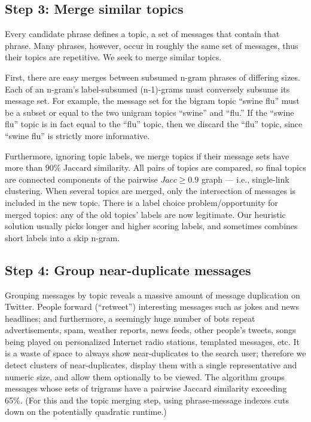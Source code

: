 \documentclass[letterpaper]{article}
\newcommand{\codenote}[1]{}
\begin{document}
\subsection{Step 3: Merge similar topics}
\codenote{ deduper.py }
Every candidate phrase defines a topic, a set of messages that contain that phrase.  Many phrases, however, occur in roughly the same set of messages, thus their topics are repetitive.  We seek to merge similar topics.

First, there are easy merges between subsumed n-gram phrases of differing sizes.  Each of an n-gram's label-subsumed (n-1)-grams must conversely subsume its message set.  For example, the message set for the bigram topic ``swine flu'' must be a subset or equal to the two unigram topics ``swine'' and ``flu.''  If the ``swine flu'' topic is in fact equal to the ``flu'' topic, then we discard the ``flu'' topic, since ``swine flu'' is strictly more informative.

Furthermore, ignoring topic labels, we merge topics if their message sets have more than $90\%$ Jaccard similarity.  All pairs of topics are compared, so final topics are connected components of the pairwise $Jacc \geq 0.9$ graph --- i.e., single-link clustering.  When several topics are merged, only the intersection of messages is included in the new topic.  There is a label choice problem/opportunity for merged topics: any of the old topics' labels are now legitimate.  Our heuristic solution usually picks longer and higher scoring labels, and sometimes combines short labels into a skip n-gram.

\subsection{Step 4: Group near-duplicate messages}

\codenote{ deduper.py }
Grouping messages by topic reveals a massive amount of message duplication on Twitter.  People forward (``retweet'') interesting messages such as jokes and news headlines; 
and furthermore, a seemingly huge number of bots repeat advertisements, spam, weather reports, news feeds, other people's tweets, songs being played on personalized Internet radio stations, templated messages, etc.
It is a waste of space to always show near-duplicates to the search user; therefore we detect clusters of near-duplicates, display them with a single representative and numeric size, and allow them optionally to be viewed.  The algorithm groups messages whose sets of trigrams have a pairwise Jaccard similarity exceeding 65\%.  (For this and the topic merging step, using phrase-message indexes cuts down on the potentially quadratic runtime.)
\end{document}
